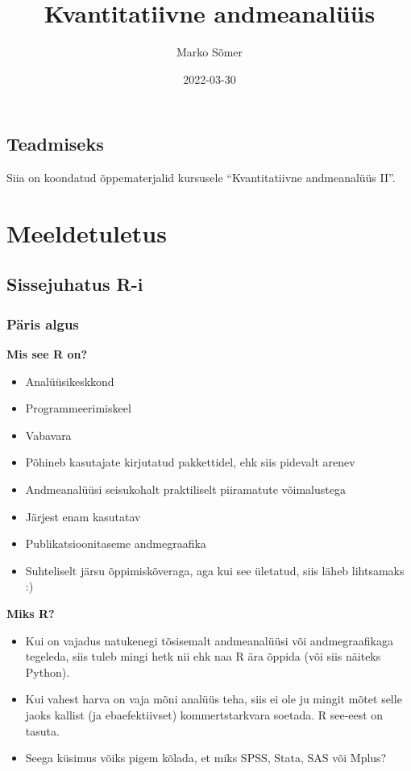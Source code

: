 \documentclass[
]{book}
\title{Kvantitatiivne andmeanalüüs}
\author{Marko Sõmer}
\date{2022-03-30}
\providecommand{\tightlist}{%
  \setlength{\itemsep}{0pt}\setlength{\parskip}{0pt}}
\begin{document}
\maketitle

{
\setcounter{tocdepth}{1}
\tableofcontents
}
\hypertarget{teadmiseks}{%
\chapter{Teadmiseks}\label{teadmiseks}}

Siia on koondatud õppematerjalid kursusele ``Kvantitatiivne andmeanalüüs II''.

\hypertarget{part-meeldetuletus}{%
\part{Meeldetuletus}\label{part-meeldetuletus}}

\hypertarget{sissejuhatus-r-i}{%
\chapter{Sissejuhatus R-i}\label{sissejuhatus-r-i}}

\hypertarget{puxe4ris-algus}{%
\section{Päris algus}\label{puxe4ris-algus}}

\textbf{Mis see R on?}

\begin{itemize}
\tightlist
\item
  Analüüsikeskkond
\item
  Programmeerimiskeel
\item
  Vabavara
\item
  Põhineb kasutajate kirjutatud pakkettidel, ehk siis pidevalt arenev
\item
  Andmeanalüüsi seisukohalt praktiliselt piiramatute võimalustega
\item
  Järjest enam kasutatav
\item
  Publikatsioonitaseme andmegraafika
\item
  Suhteliselt järsu õppimiskõveraga, aga kui see ületatud, siis läheb lihtsamaks :)
\end{itemize}

\textbf{Miks R?}

\begin{itemize}
\tightlist
\item
  Kui on vajadus natukenegi tõsisemalt andmeanalüüsi või andmegraafikaga tegeleda, siis tuleb mingi hetk nii ehk naa R ära õppida (või siis näiteks Python).
\item
  Kui vahest harva on vaja mõni analüüs teha, siis ei ole ju mingit mõtet selle jaoks kallist (ja ebaefektiivset) kommertstarkvara soetada. R see-eest on tasuta.
\item
  Seega küsimus võiks pigem kõlada, et miks SPSS, Stata, SAS või Mplus?
\end{itemize}
\end{document}
